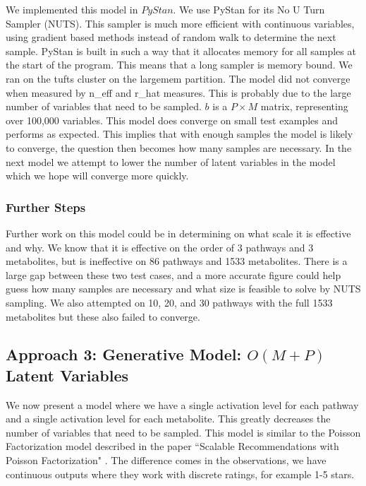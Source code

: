 \documentclass[11pt]{article}
\begin{document}
We implemented this model in $PyStan$. We use PyStan for its No U Turn Sampler (NUTS). This sampler is much more efficient with continuous variables, using gradient based methods instead of random walk to determine the next sample. PyStan is built in such a way that it allocates memory for all samples at the start of the program. This means that a long sampler is memory bound. We ran on the tufts cluster on the largemem partition. The model did not converge when measured by n\_eff and r\_hat measures. This is probably due to the large number of variables that need to be sampled. $b$ is a $P \times M$ matrix, representing over 100,000 variables. This model does converge on small test examples and performs as expected. This implies that with enough samples the model is likely to converge, the question then becomes how many samples are necessary. In the next model we attempt to lower the number of latent variables in the model which we hope will converge more quickly.

\subsubsection{Further Steps}

Further work on this model could be in determining on what scale it is effective and why. We know that it is effective on the order of 3 pathways and 3 metabolites, but is ineffective on 86 pathways and 1533 metabolites. There is a large gap between these two test cases, and a more accurate figure could help guess how many samples are necessary and what size is feasible to solve by NUTS sampling. We also attempted on 10, 20, and 30 pathways with the full 1533 metabolites but these also failed to converge.

\subsection{Approach 3: Generative Model: $O(M+P)$ Latent Variables}

We now present a model where we have a single activation level for each pathway and a single activation level for each metabolite. This greatly decreases the number of variables that need to be sampled. This model is similar to the Poisson Factorization model described in the paper ``Scalable Recommendations with Poisson Factorization" \cite{Poisson13}. The difference comes in the observations, we have continuous outputs where they work with discrete ratings, for example 1-5 stars. 
\end{document}
